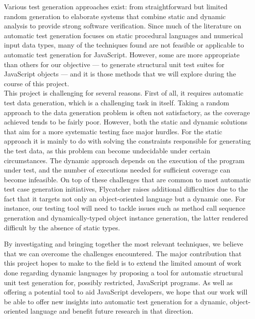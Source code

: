 Various test generation approaches exist: from straightforward but limited random generation to elaborate systems that combine static and dynamic analysis to provide strong software verification. Since much of the literature on automatic test generation focuses on static procedural languages and numerical input data types, many of the techniques found are not feasible or applicable to automatic test generation for JavaScript. However, some are more appropriate than others for our objective --- to generate structural unit test suites for JavaScript objects --- and it is those methods that we will explore during the course of this project.\\

This project is challenging for several reasons. First of all, it requires automatic test data generation, which is a challenging task in itself. Taking a random approach to the data generation problem is often not satisfactory, as the coverage achieved tends to be fairly poor. However, both the static and dynamic solutions that aim for a more systematic testing face major hurdles. For the static approach it is mainly to do with solving the constraints responsible for generating the test data, as this problem can become undecidable under certain circumstances. The dynamic approach depends on the execution of the program under test, and the number of executions needed for sufficient coverage can become infeasible. On top of these challenges that are common to most automatic test case generation initiatives, \textsf{Flycatcher} raises additional difficulties due to the fact that it targets not only an object-oriented language but a dynamic one. For instance, our testing tool will need to tackle issues such as method call sequence generation and dynamically-typed object instance generation, the latter rendered difficult by the absence of static types.

By investigating and bringing together the most relevant techniques, we believe that we can overcome the challenges encountered. The major contribution that this project hopes to make to the field is to extend the limited amount of work done regarding dynamic languages by proposing a tool for automatic structural unit test generation for, possibly restricted, JavaScript programs. As well as offering a potential tool to aid JavaScript developers, we hope that our work will be able to offer new insights into automatic test generation for a dynamic, object-oriented language and benefit future research in that direction.